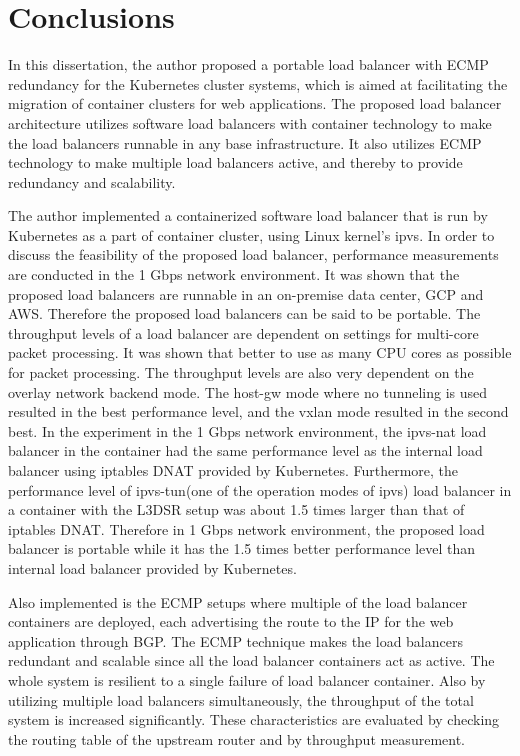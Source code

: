 \section{Conclusions}\label{Conclusions}

In this dissertation, the author proposed a portable load balancer with ECMP redundancy for the Kubernetes cluster systems, which is aimed at facilitating the migration of container clusters for web applications.
The proposed load balancer architecture utilizes software load balancers with container technology to make the load balancers runnable in any base infrastructure.
It also utilizes ECMP technology to make multiple load balancers active, and thereby to provide redundancy and scalability.


The author implemented a containerized software load balancer that is run by Kubernetes as a part of container cluster, using Linux kernel's ipvs.
In order to discuss the feasibility of the proposed load balancer, performance measurements are conducted in the 1 Gbps network environment.
It was shown that the proposed load balancers are runnable in an on-premise data center, GCP and AWS.
Therefore the proposed load balancers can be said to be portable.
The throughput levels of a load balancer are dependent on settings for multi-core packet processing.
It was shown that better to use as many CPU cores as possible for packet processing.
The throughput levels are also very dependent on the overlay network backend mode.
The host-gw mode where no tunneling is used resulted in the best performance level, and the vxlan mode resulted in the second best.
In the experiment in the 1 Gbps network environment, the ipvs-nat load balancer in the container had the same performance level as the internal load balancer using iptables DNAT provided by Kubernetes.
Furthermore, the performance level of ipvs-tun(one of the operation modes of ipvs) load balancer in a container with the L3DSR setup was about 1.5 times larger than that of iptables DNAT.
Therefore in 1 Gbps network environment, the proposed load balancer is portable while it has the 1.5 times better performance level than internal load balancer provided by Kubernetes.

Also implemented is the ECMP setups where multiple of the load balancer containers are deployed, each advertising the route to the IP for the web application through BGP.
The ECMP technique makes the load balancers redundant and scalable since all the load balancer containers act as active.
The whole system is resilient to a single failure of load balancer container.
Also by utilizing multiple load balancers simultaneously, the throughput of the total system is increased significantly.
These characteristics are evaluated by checking the routing table of the upstream router and by throughput measurement.

